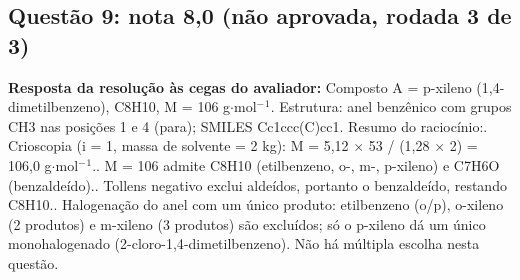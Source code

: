 \documentclass{article}%
\begin{document}
\subsection*{Questão 9: nota 8,0 (não aprovada, rodada 3 de 3)}%
\textbf{Resposta da resolução às cegas do avaliador:} Composto A = p{-}xileno (1,4{-}dimetilbenzeno), C8H10, M = 106 g$\cdot$mol$^{-}$$^{1}$. Estrutura: anel benzênico com grupos CH3 nas posições 1 e 4 (para); SMILES Cc1ccc(C)cc1.\newline%
\newline%
Resumo do raciocínio:. Crioscopia (i = 1, massa de solvente = 2 kg): M = 5,12 $\times$ 53 / (1,28 $\times$ 2) = 106,0 g$\cdot$mol$^{-}$$^{1}$.. M = 106 admite C8H10 (etilbenzeno, o{-}, m{-}, p{-}xileno) e C7H6O (benzaldeído).. Tollens negativo exclui aldeídos, portanto o benzaldeído, restando C8H10.. Halogenação do anel com um único produto: etilbenzeno (o/p), o{-}xileno (2 produtos) e m{-}xileno (3 produtos) são excluídos; só o p{-}xileno dá um único monohalogenado (2{-}cloro{-}1,4{-}dimetilbenzeno).\newline%
\newline%
Não há múltipla escolha nesta questão.\par %
\end{document}
